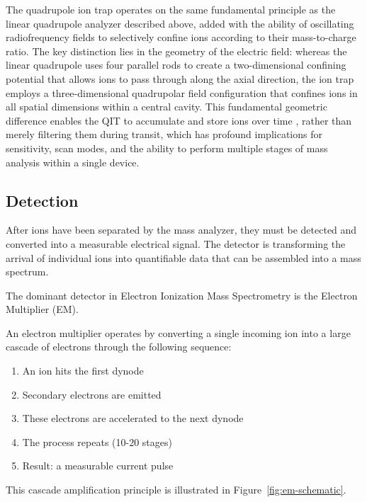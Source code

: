 The quadrupole ion trap operates on the same fundamental principle as the linear quadrupole analyzer described above, added with the ability of oscillating radiofrequency fields to selectively confine ions according to their mass-to-charge ratio. \cite[p.~1156]{Raffaelli2021}
The key distinction lies in the geometry of the electric field: whereas the linear quadrupole uses four parallel rods to create a two-dimensional confining potential that allows ions to pass through along the axial direction, the ion trap employs a three-dimensional quadrupolar field configuration that confines ions in all spatial dimensions within a central cavity. \cite[p.~962]{March2009}
This fundamental geometric difference enables the QIT to accumulate and store ions over time \cite[p.~973]{March2009}, rather than merely filtering them during transit, which has profound implications for sensitivity, scan modes, and the ability to perform multiple stages of mass analysis within a single device. \cite[p.~984]{March2009}


\subsection{Detection}

After ions have been separated by the mass analyzer, they must be detected and converted into a measurable electrical signal. \cite[pp.~5-6]{Dass2007}
The detector is transforming the arrival of individual ions into quantifiable data that can be assembled into a mass spectrum. \cite[p.~103]{Dass2007}

The dominant detector in Electron Ionization Mass Spectrometry is the Electron Multiplier (EM).
\cite[p.~103]{Dass2007}

An electron multiplier operates by converting a single incoming ion into a large cascade of electrons through the following sequence:

\begin{enumerate}
    \item An ion hits the first dynode
    \item Secondary electrons are emitted
    \item These electrons are accelerated to the next dynode
    \item The process repeats (10-20 stages)
    \item Result: a measurable current pulse
\end{enumerate}

This cascade amplification principle is illustrated in Figure~\ref{fig:em-schematic}.


